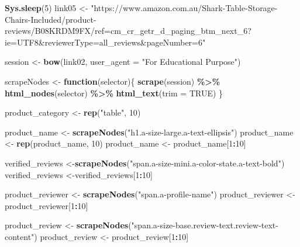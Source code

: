 \documentclass[
]{article}
\newenvironment{Shaded}{\begin{snugshade}}{\end{snugshade}}
\newcommand{\AttributeTok}[1]{\textcolor[rgb]{0.13,0.29,0.53}{#1}}
\newcommand{\ConstantTok}[1]{\textcolor[rgb]{0.56,0.35,0.01}{#1}}
\newcommand{\ControlFlowTok}[1]{\textcolor[rgb]{0.13,0.29,0.53}{\textbf{#1}}}
\newcommand{\DecValTok}[1]{\textcolor[rgb]{0.00,0.00,0.81}{#1}}
\newcommand{\FunctionTok}[1]{\textcolor[rgb]{0.13,0.29,0.53}{\textbf{#1}}}
\newcommand{\NormalTok}[1]{#1}
\newcommand{\OtherTok}[1]{\textcolor[rgb]{0.56,0.35,0.01}{#1}}
\newcommand{\SpecialCharTok}[1]{\textcolor[rgb]{0.81,0.36,0.00}{\textbf{#1}}}
\newcommand{\StringTok}[1]{\textcolor[rgb]{0.31,0.60,0.02}{#1}}
\begin{document}
\begin{Shaded}
\begin{Highlighting}[]
   \FunctionTok{Sys.sleep}\NormalTok{(}\DecValTok{5}\NormalTok{)}
\NormalTok{link05 }\OtherTok{\textless{}{-}} \StringTok{"https://www.amazon.com.au/Shark{-}Table{-}Storage{-}Chairs{-}Included/product{-}reviews/B08KRDM9FX/ref=cm\_cr\_getr\_d\_paging\_btm\_next\_6?ie=UTF8\&reviewerType=all\_reviews\&pageNumber=6"}


\NormalTok{  session }\OtherTok{\textless{}{-}} \FunctionTok{bow}\NormalTok{(link02,}
               \AttributeTok{user\_agent =} \StringTok{"For Educational Purpose"}\NormalTok{)}

\NormalTok{  scrapeNodes }\OtherTok{\textless{}{-}} \ControlFlowTok{function}\NormalTok{(selector)\{}
    \FunctionTok{scrape}\NormalTok{(session) }\SpecialCharTok{\%\textgreater{}\%}
      \FunctionTok{html\_nodes}\NormalTok{(selector) }\SpecialCharTok{\%\textgreater{}\%}
      \FunctionTok{html\_text}\NormalTok{(}\AttributeTok{trim =} \ConstantTok{TRUE}\NormalTok{)}
\NormalTok{  \}}

\NormalTok{  product\_category }\OtherTok{\textless{}{-}} \FunctionTok{rep}\NormalTok{(}\StringTok{"table"}\NormalTok{, }\DecValTok{10}\NormalTok{)}

\NormalTok{  product\_name }\OtherTok{\textless{}{-}} \FunctionTok{scrapeNodes}\NormalTok{(}\StringTok{"h1.a{-}size{-}large.a{-}text{-}ellipsis"}\NormalTok{)}
\NormalTok{  product\_name }\OtherTok{\textless{}{-}} \FunctionTok{rep}\NormalTok{(product\_name, }\DecValTok{10}\NormalTok{)}
\NormalTok{  product\_name }\OtherTok{\textless{}{-}}\NormalTok{ product\_name[}\DecValTok{1}\SpecialCharTok{:}\DecValTok{10}\NormalTok{]}
  
\NormalTok{  verified\_reviews }\OtherTok{\textless{}{-}}\FunctionTok{scrapeNodes}\NormalTok{(}\StringTok{"span.a{-}size{-}mini.a{-}color{-}state.a{-}text{-}bold"}\NormalTok{)}
\NormalTok{  verified\_reviews }\OtherTok{\textless{}{-}}\NormalTok{verified\_reviews[}\DecValTok{1}\SpecialCharTok{:}\DecValTok{10}\NormalTok{]}
  
\NormalTok{  product\_reviewer }\OtherTok{\textless{}{-}} \FunctionTok{scrapeNodes}\NormalTok{(}\StringTok{"span.a{-}profile{-}name"}\NormalTok{)}
\NormalTok{  product\_reviewer }\OtherTok{\textless{}{-}}\NormalTok{ product\_reviewer[}\DecValTok{1}\SpecialCharTok{:}\DecValTok{10}\NormalTok{]}
  
\NormalTok{  product\_review }\OtherTok{\textless{}{-}} \FunctionTok{scrapeNodes}\NormalTok{(}\StringTok{"span.a{-}size{-}base.review{-}text.review{-}text{-}content"}\NormalTok{)}
\NormalTok{  product\_review }\OtherTok{\textless{}{-}}\NormalTok{ product\_review[}\DecValTok{1}\SpecialCharTok{:}\DecValTok{10}\NormalTok{]}
  

\end{Highlighting}
\end{Shaded}
\end{document}
